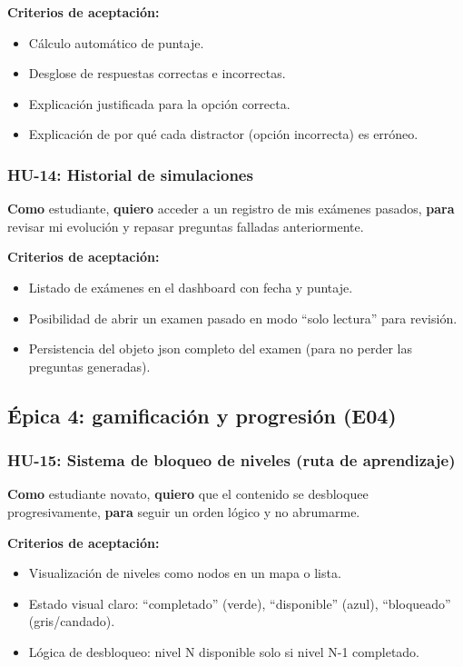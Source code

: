 \textbf{Criterios de aceptación:}
\begin{itemize}
\item Cálculo automático de puntaje.
\item Desglose de respuestas correctas e incorrectas.
\item Explicación justificada para la opción correcta.
\item Explicación de por qué cada distractor (opción incorrecta) es erróneo.
\end{itemize}

\subsubsection{HU-14: Historial de simulaciones}
\textbf{Como} estudiante,
\textbf{quiero} acceder a un registro de mis exámenes pasados,
\textbf{para} revisar mi evolución y repasar preguntas falladas anteriormente.

\textbf{Criterios de aceptación:}
\begin{itemize}
\item Listado de exámenes en el dashboard con fecha y puntaje.
\item Posibilidad de abrir un examen pasado en modo \enquote{solo lectura} para revisión.
\item Persistencia del objeto \gls{json} completo del examen (para no perder las preguntas generadas).
\end{itemize}

\subsection{Épica 4: gamificación y progresión (E04)}

\subsubsection{HU-15: Sistema de bloqueo de niveles (ruta de aprendizaje)}
\textbf{Como} estudiante novato,
\textbf{quiero} que el contenido se desbloquee progresivamente,
\textbf{para} seguir un orden lógico y no abrumarme.

\textbf{Criterios de aceptación:}
\begin{itemize}
\item Visualización de niveles como nodos en un mapa o lista.
\item Estado visual claro: \enquote{completado} (verde), \enquote{disponible} (azul), \enquote{bloqueado} (gris/candado).
\item Lógica de desbloqueo: nivel N disponible solo si nivel N-1 completado.
\end{itemize}

